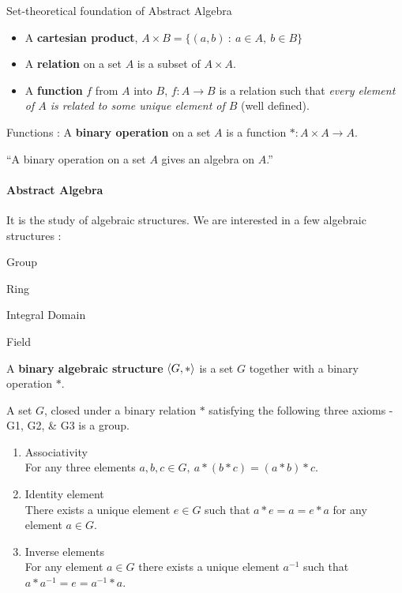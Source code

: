 \begin{definition}Set-theoretical foundation of Abstract Algebra
\begin{itemize}
	\item A \textbf{cartesian product}, $A \times B = \{ (a,b) \ : \ a \in A,\ b \in B \}$%
	\item A \textbf{relation} on a set $A$ is a subset of $A \times A$.%
	\item A \textbf{function} $f$ from $A$ into $B$,
	$f : A \to B$ is a relation such that \textit{every element of $A$ is related to some unique element of $B$} (well defined).%
\end{itemize}
\end{definition}

\begin{definition} Functions :
	A \textbf{binary operation} on a set $A$ is a function $\ast : A \times A \to A$.%
\end{definition}

``A binary operation on a set $A$ gives an algebra on $A$.''%
\begin{story}
\paragraph{Abstract Algebra}
	It is the study of algebraic structures.
	We are interested in a few algebraic structures :
	\begin{enumerate*}
		\item Group
		\item Ring
		\item Integral Domain
		\item Field
	\end{enumerate*}
\end{story}

\begin{definition}
	A \textbf{binary algebraic structure} $\langle G,\ast \rangle$ is a set $G$ together with a binary operation $\ast$.
\end{definition}

\begin{definition}[Group]
	A set $G$, closed under a binary relation $\ast$ satisfying the following three axioms -G1, G2, \& G3 is a group.%
\begin{enumerate}[label=G\arabic*]
	\item Associativity \\
		For any three elements $a,b,c \in G,\ a \ast (b \ast c) = (a \ast b) \ast c$.
	\item Identity element\\
		There exists a unique element $e \in G$ such that $a \ast e = a = e \ast a$ for any element $a \in G$.
	\item Inverse elements\\
		For any element $a \in G$ there exists a unique element $a^{-1}$ such that $a \ast a^{-1} = e = a^{-1} \ast a$.
\end{enumerate}
\end{definition}

